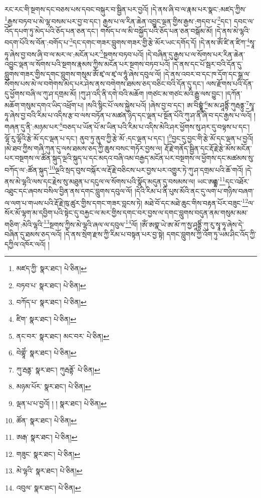 རང་རང་གི་སྔགས་དང་བཅས་པས་དབང་བསྐུར་བ་སྦྱིན་པར་བྱའོ། །དེ་ནས་ཞི་བ་ལ་རྣམ་པར་སྣང་:མཛད་ཀྱིས་\footnote{མཛད་ཀྱི་  སྣར་ཐང་།  པེ་ཅིན། }རྒྱས་བཏབ་པ་མེ་ལྷ་བསམ་པར་བྱ་བ་དང་། རྒྱས་པ་ལ་རིན་ཆེན་འབྱུང་ལྡན་གྱིས་རྒྱས་:གདབ་པ་\footnote{བཏབ་པ་  སྣར་ཐང་།  པེ་ཅིན། }དང་། དབང་ལ་འོད་དཔག་ཏུ་མེད་པའི་ཅོད་པན་ཅན་དང་། གསོད་པ་ལ་མི་བསྐྱོད་པའི་ཅོད་པན་ཅན་བསྒོམ་མོ། །དེ་ནས་མེ་ལྷའི་བདག་པོའི་ས་བོན་:བགོད་པ་\footnote{བཀོད་པ་  སྣར་ཐང་།  པེ་ཅིན། }དང་དགང་གཟར་བླུགས་གཟར་གྱི་རྩེ་མོར་ཡང་དགོད་དོ། །དེ་ནས་ཨོཾ་ཛི་ན་ཛིཀ་\footnote{ཛིག་  སྣར་ཐང་།  པེ་ཅིན། }སྭཱ་ཧཱ་ཞེས་བྱ་བས་ཞི་བ་ལ་མར་ལ་:མངོན་པར་\footnote{ནང་བར་  སྣར་ཐང་། མང་བར་  པེ་ཅིན། }སྔགས་བཏབ་པའོ། །དེ་བཞིན་དུ་རྒྱས་པ་ལ་སོགས་པར་རིན་ཆེན་འབྱུང་ལྡན་ལ་སོགས་པའི་སྔགས་རྣམས་ཀྱིས་མངོན་པར་སྔགས་བཏབ་པའོ། །དེ་ནས་དང་པོ་སྦར་བའི་དོན་དུ་བླུགས་གཟར་གྱིས་དགང་བླུགས་གསུམ་ཨོཾ་ཛྭ་ལ་ཛྭ་ལ་ཧཱུཾ་ཞེས་དབུལ་ལོ། །དེ་ནས་འབར་བ་དང་ཁ་དོག་དང་སྒྲ་ལ་སོགས་པས་མེ་ལ་བགེགས་མེད་པར་ཤེས་ནས་བགེགས་ཐམས་ཅད་བཅིང་བའི་དོན་དུ་དང་། ལས་རྫོགས་པའི་དོན་དུ་ཕྱོགས་བཞི་ལ་ཀུ་ཤ་དགྲམ་མོ། །ཀུ་ཤ་འདི་ནི་དགེ་བའི་མཆོག །གཙང་མ་གཙང་མའི་རྒྱུ་ལས་བྱུང་། །དཀོན་མཆོག་གསུམ་དགའ་ཡིད་འཕྲོག་པ། །སའི་སྙིང་པོ་ལས་སྐྱེས་པའོ། །ཞེས་བྱ་བ་དང་། ཨ་བིགྷྣཱཾ་\footnote{བེགྷཱེཾ་  སྣར་ཐང་།  པེ་ཅིན། }མ་མ་ཤཱནྟིཾ་ཀུརྦནྟུ་\footnote{ཀུ་རྦནྟ་  སྣར་ཐང་། ཀུརྦནྟོ་  པེ་ཅིན། }སྭཱ་ཧཱ་ཞེས་བྱ་བའི་རིམ་པ་འདིས་རྩ་བ་ལས་བཏོན་པ་མཚན་ཉིད་དང་ལྡན་པ་སྔོན་པོའི་ཀུ་ཤ་ནི་ཞི་བ་དང་རྒྱས་པ་ལའོ། །གཞན་དུ་ནི་:མཉམ་པར་\footnote{མཉམ་པོར་  སྣར་ཐང་།  པེ་ཅིན། }བཅད་པ་ཡོན་པོ་མ་ཡིན་པའི་རིམ་པ་འདིས་མེའི་ཤར་ཕྱོགས་སུ་ཤར་དུ་བལྟས་པ་དང་། ལྷོ་རུ་ལྷོའི་རྩེ་མོ་དང་ལྡན་པ་དང་། ནུབ་ཏུ་ནུབ་ཀྱི་རྩེ་མོ་:དང་ལྡན་པ་དང་། །\footnote{ལྡན་པ་པ་བྱའོ། ། །  སྣར་ཐང་།  པེ་ཅིན། }བྱང་དུ་བྱང་གི་རྩེ་མོ་དང་ལྡན་པ་བྱའོ། །མེ་ཐབ་ཀྱིས་གཞི་ཀུན་དུ་ལས་ཐམས་ཅད་ཀྱི་ཆུས་བསང་གཏོར་བྱས་ལ། རྡོ་རྗེ་གནོད་སྦྱིན་དང་རྡོ་རྗེ་རྩེ་མོས་མངོན་པར་བསྔགས་ལ་ཚོན་སྐུད་ལྔའི་སྐུད་པ་དང་མདའ་བཞི་འམ་བརྒྱད་མངོན་པར་བསྔགས་ལ་ཕྱོགས་དང་མཚམས་སུ་བཀོད་ལ་:ཚོན་སྐུད་\footnote{ཚོན་  སྣར་ཐང་།  པེ་ཅིན། }ལྔའི་སྲད་བུས་བསྐོར་ལ་རྡོ་རྗེ་བཅིངས་པར་བྱས་པར་འགྱུར་ཏེ་ཀུ་ཤ་དགྲམ་པའི་ཆོ་གའོ། །དེ་ནས་མེ་ལྷའི་ལས་དང་རྗེས་སུ་མཐུན་པ་དངུལ་ལ་སོགས་པའི་སྣོད་མདུན་དུ་བསམས་ལ། ཡང་ཨརྒྷ་\footnote{ཨརྒ་  སྣར་ཐང་།  པེ་ཅིན། }དང་འཐོར་འཐུང་དང་ཞབས་བསིལ་བྱིན་ནས་དགང་བླུགས་དབུལ་ལོ། །དེའི་རིམ་པ་ནི་པུས་མོའི་ནང་དུ་ལག་པ་གཉིས་བཞག་ལ་ལག་པ་གཡས་པའི་རྡོ་རྗེ་ཁུ་ཚུར་གྱིས་དགང་གཟར་བླངས་ཏེ། མཐེ་བོ་དང་མཐེ་ཆུང་གིས་བརྟན་པོར་བཟུང་\footnote{གཟུང་  སྣར་ཐང་།  པེ་ཅིན། }ལ་སོར་མོ་ལྷག་མ་དབྱིག་པའི་སྟེང་དུ་བརྐྱང་ལ་མར་གྱིས་དགང་བར་བྱས་ལ་དགང་བླུགས་བདུན་ནམ་གསུམ་མམ་གཅིག་:མེའི་ལྷའི་\footnote{མེ་ལྷའི་  སྣར་ཐང་།  པེ་ཅིན། }སྔགས་ཀྱིས་མེ་ལྷའི་ཞལ་ལ་དབུལ་\footnote{འབུལ་  སྣར་ཐང་།  པེ་ཅིན། }ལོ། །ཨོཾ་ཨགྣ་ཡེ་ཨ་མོ་ཀ་སྱ་ཤཱནྟིཾ་ཀུ་རུ་སྭཱ་ཧཱ་ཞེས་དེ་བཞིན་དུ་ཐམས་ཅད་ལའོ། །དེ་ནས་སྲེག་རྫས་ཀྱི་རིམ་པ་བསྟན་པར་བྱ་སྟེ། དགང་བླུགས་ཀྱི་འོག་ཏུ་ཡམ་ཤིང་འོད་ཀྱི་དཀྱིལ་འཁོར་ལའོ། །
